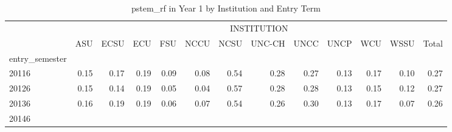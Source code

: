 \begin{table}[!h]
\caption{pstem\_rf in Year 1 by Institution and Entry Term}
\centering
\begin{tabular}{lllllllllllll}
\cline{1-13}
\multicolumn{1}{c}{} &
  \multicolumn{12}{|c}{INSTITUTION} \\
\multicolumn{1}{c}{} &
  \multicolumn{1}{|r}{ASU} &
  \multicolumn{1}{r}{ECSU} &
  \multicolumn{1}{r}{ECU} &
  \multicolumn{1}{r}{FSU} &
  \multicolumn{1}{r}{NCCU} &
  \multicolumn{1}{r}{NCSU} &
  \multicolumn{1}{r}{UNC-CH} &
  \multicolumn{1}{r}{UNCC} &
  \multicolumn{1}{r}{UNCP} &
  \multicolumn{1}{r}{WCU} &
  \multicolumn{1}{r}{WSSU} &
  \multicolumn{1}{r}{Total} \\
\cline{1-13}
\multicolumn{1}{l}{entry\_semester} &
  \multicolumn{1}{|r}{} &
  \multicolumn{1}{r}{} &
  \multicolumn{1}{r}{} &
  \multicolumn{1}{r}{} &
  \multicolumn{1}{r}{} &
  \multicolumn{1}{r}{} &
  \multicolumn{1}{r}{} &
  \multicolumn{1}{r}{} &
  \multicolumn{1}{r}{} &
  \multicolumn{1}{r}{} &
  \multicolumn{1}{r}{} &
  \multicolumn{1}{r}{} \\
\multicolumn{1}{l}{\hspace{1em}20116} &
  \multicolumn{1}{|r}{0.15} &
  \multicolumn{1}{r}{0.17} &
  \multicolumn{1}{r}{0.19} &
  \multicolumn{1}{r}{0.09} &
  \multicolumn{1}{r}{0.08} &
  \multicolumn{1}{r}{0.54} &
  \multicolumn{1}{r}{0.28} &
  \multicolumn{1}{r}{0.27} &
  \multicolumn{1}{r}{0.13} &
  \multicolumn{1}{r}{0.17} &
  \multicolumn{1}{r}{0.10} &
  \multicolumn{1}{r}{0.27} \\
\multicolumn{1}{l}{\hspace{1em}20126} &
  \multicolumn{1}{|r}{0.15} &
  \multicolumn{1}{r}{0.14} &
  \multicolumn{1}{r}{0.19} &
  \multicolumn{1}{r}{0.05} &
  \multicolumn{1}{r}{0.04} &
  \multicolumn{1}{r}{0.57} &
  \multicolumn{1}{r}{0.28} &
  \multicolumn{1}{r}{0.28} &
  \multicolumn{1}{r}{0.13} &
  \multicolumn{1}{r}{0.15} &
  \multicolumn{1}{r}{0.12} &
  \multicolumn{1}{r}{0.27} \\
\multicolumn{1}{l}{\hspace{1em}20136} &
  \multicolumn{1}{|r}{0.16} &
  \multicolumn{1}{r}{0.19} &
  \multicolumn{1}{r}{0.19} &
  \multicolumn{1}{r}{0.06} &
  \multicolumn{1}{r}{0.07} &
  \multicolumn{1}{r}{0.54} &
  \multicolumn{1}{r}{0.26} &
  \multicolumn{1}{r}{0.30} &
  \multicolumn{1}{r}{0.13} &
  \multicolumn{1}{r}{0.17} &
  \multicolumn{1}{r}{0.07} &
  \multicolumn{1}{r}{0.26} \\
\multicolumn{1}{l}{\hspace{1em}20146} &

\end{tabular}
\end{table}
